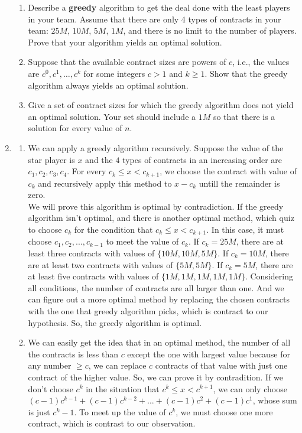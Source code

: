 \documentclass[12pt,a4paper]{article}
\makeatletter
\newtheorem*{solution}{Solution}
\theoremstyle{definition}
\renewenvironment{solution}[1][Solution] {\par\pushQED{\qed}\normalfont\topsep6\p@\@plus6\p@\relax\trivlist\item[\hskip\labelsep\bfseries#1\@addpunct{.}]\ignorespaces}{\popQED\endtrivlist\@endpefalse} \makeatother
\makeatother
\begin{document}
\begin{enumerate}
	\begin{enumerate}
		\item Describe a \textbf{greedy} algorithm to get the deal done with the least players in your team. Assume that there are only 4 types of contracts in your team: $25M$, $ 10M $, $ 5M $, $ 1M $, and there is no limit to the number of players. Prove that your algorithm yields an optimal solution.
		\item Suppose that the available contract sizes are powers of $c$,
		i.e., the values are $c^{0}, c^{1}, \ldots, c^{k}$ for some integers $c>1$ and $k \geq 1$. Show that the greedy algorithm always yields an optimal solution.
		\item Give a set of contract sizes for which the greedy algorithm does not yield an optimal solution. Your set should include a $ 1M $ so that there is a solution for every value of $ n $.
	\end{enumerate}
    \begin{solution}
        \begin{enumerate}
			\item We can apply a greedy algorithm recursively. Suppose the value of the star player is $x$ and the $4$ types of contracts in an increasing order are $c_1,c_2,c_3,c_4$. For every $c_k \leqslant x< c_{k+1}$, we choose the contract with value of $c_k$ and recursively apply this method to $x-c_k$ untill the remainder is zero.
			      \\We will prove this algorithm is optimal by contradiction. If the greedy algorithm isn't optimal, and there is another optimal method, which quiz to choose $c_k$ for the condition that $c_k \leqslant x< c_{k+1}$. In this case, it must choose $c_1,c_2,...,c_{k-1}$ to meet the value of $c_k$. If $c_k=25M$, there are at least three contracts with values of $\{10M,10M,5M\}$. If $c_k=10M$, there are at least two contracts with values of $\{5M,5M\}$. If $c_k=5M$, there are at least five contracts with values of $\{1M,1M,1M,1M,1M\}$.
				  Considering all conditions, the number of contracts are all larger than one. And we can figure out a more optimal method by replacing the chosen contracts with the one that greedy algorithm picks, which is contract to our hypothesis. So, the greedy algorithm is optimal.
			\item We can easily get the idea that in an optimal method, the number of all the contracts is less than $c$ except the one with largest value because for any number $\geqslant c$, we can replace $c$ contracts of that value with just one contract of the higher value. So, we can prove it by contradition. If we don't choose $c^k$ in the situation that $c^k \leqslant x< c^{k+1}$, we can only choose $(c-1)c^{k-1}+(c-1)c^{k-2}+...+(c-1)c^{2}+(c-1)c^{1}$, whose sum is just $c^k-1$. To meet up the value of $c^k$, we must choose one more contract, which is contrast to our observation.

\end{enumerate}
\end{solution}
\end{enumerate}
\end{document}
